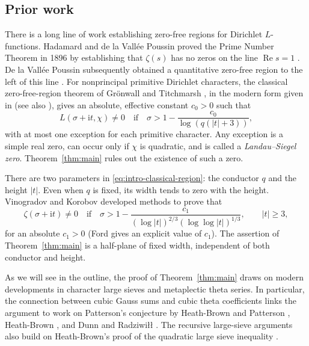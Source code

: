 \documentclass[11pt,a4paper]{article}
\numberwithin{equation}{section}
\numberwithin{figure}{section}
\theoremstyle{definition}
\theoremstyle{remark}
\newcommand{\Rea}{\operatorname{Re}}
\begin{document}
\subsection{Prior work}

There is a long line of work establishing zero-free regions for Dirichlet $L$-functions. Hadamard and de la Vall\'ee Poussin proved the Prime Number Theorem
in 1896 by establishing that $\zeta(s)$ has no zeros on the line
$\Rea s=1$ \cite{Had96,VP96}. De la Vall\'ee Poussin subsequently obtained a
quantitative zero-free region to the left of this line \cite{VP99}.
For nonprincipal primitive Dirichlet characters, the classical zero-free-region theorem of Gr\"onwall and Titchmarsh
\cite{Gro13,Tit30}, in the modern form given in \cite[Theorem~5.26]{IK04}
(see also \cite[Chapter~14]{Dav00}), gives an absolute, effective constant $c_0>0$ such that
\begin{equation}\label{eq:intro-classical-region}
 L(\sigma+\mathrm i t,\chi)\ne0
 \quad\text{if}\quad
 \sigma>1-\frac{c_0}{\log(q(|t|+3))},
\end{equation}
with at most one exception for each primitive character.
Any exception is a simple real zero, can occur only if
$\chi$ is quadratic, and is called a \emph{Landau--Siegel zero}. Theorem~\ref{thm:main} rules out the existence of such a zero.

There are two parameters in \eqref{eq:intro-classical-region}:
the conductor $q$ and the height $|t|$. Even when $q$ is fixed,
its width tends to zero with the height. Vinogradov and Korobov
developed methods \cite{Vin58,Kor58} to prove that
\begin{equation}\label{eq:intro-vk-region}
 \zeta(\sigma+\mathrm i t)\ne0
 \quad\text{if}\quad
 \sigma>1-\frac{c_1}
 { (\log|t|)^{2/3}(\log\log|t|)^{1/3}},\qquad |t|\ge3,
\end{equation}
for an absolute $c_1>0$ (Ford \cite{Ford02} gives an explicit value of $c_1$). The assertion
of Theorem~\ref{thm:main} is a half-plane of fixed width, independent
of both conductor and height.

As we will see in the outline, the proof of Theorem~\ref{thm:main} draws on
modern developments in character large sieves and metaplectic theta series.
In particular, the connection between cubic Gauss sums and cubic theta
coefficients \cite{Kub69,Pat77} links the argument to work on Patterson's
conjecture by Heath-Brown and Patterson \cite{HBP79}, Heath-Brown
\cite{HB00}, and Dunn and Radziwi\l\l{} \cite{DR}.
The recursive large-sieve arguments also build on Heath-Brown's proof of
the quadratic large sieve inequality \cite{HB95}.
\end{document}
